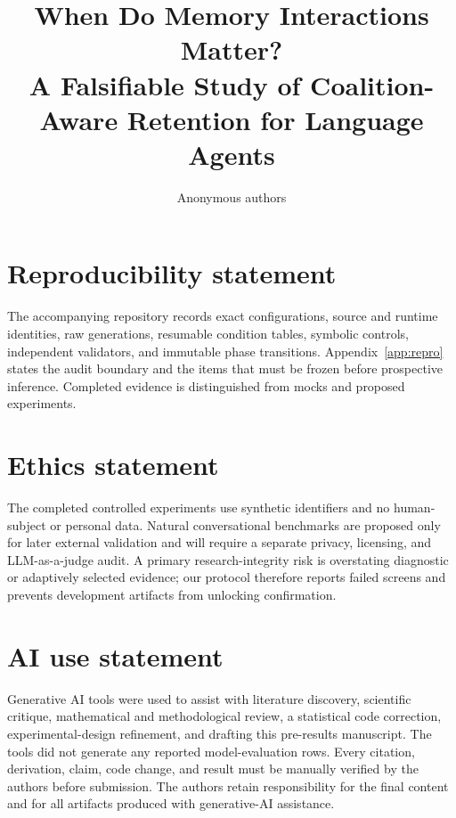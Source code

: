 \documentclass{article}
\title{When Do Memory Interactions Matter?\\
A Falsifiable Study of Coalition-Aware Retention for Language Agents}
\author{Anonymous authors}
\begin{document}
\maketitle











\section*{Reproducibility statement}
The accompanying repository records exact configurations, source and runtime
identities, raw generations, resumable condition tables, symbolic controls,
independent validators, and immutable phase transitions. Appendix~\ref{app:repro}
states the audit boundary and the items that must be frozen before prospective
inference. Completed evidence is distinguished from mocks and proposed experiments.

\section*{Ethics statement}
The completed controlled experiments use synthetic identifiers and no human-subject
or personal data. Natural conversational benchmarks are proposed only for later
external validation and will require a separate privacy, licensing, and
LLM-as-a-judge audit. A primary research-integrity risk is overstating diagnostic or
adaptively selected evidence; our protocol therefore reports failed screens and
prevents development artifacts from unlocking confirmation.

\section*{AI use statement}
Generative AI tools were used to assist with literature discovery, scientific
critique, mathematical and methodological review, a statistical code correction,
experimental-design refinement, and drafting this pre-results manuscript. The tools
did not generate any reported model-evaluation rows. Every citation, derivation,
claim, code change, and result must be manually verified by the authors before
submission. The authors retain responsibility for the final content and for all
artifacts produced with generative-AI assistance.




\appendix

\end{document}
